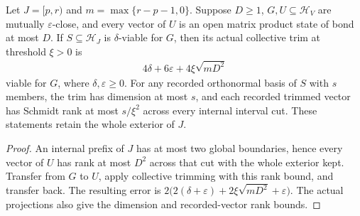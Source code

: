 \begin{lemma}
    \label{thm:interval_trimming_reference}
    \leanok
    Let $J=[p,r)$ and $m=\max\{r-p-1,0\}$. Suppose $D\ge1$,
    $G,U\subseteq\mathcal H_V$ are mutually $\varepsilon$-close, and
    every vector of $U$ is an open matrix product state of bond at most
    $D$. If $S\subseteq\mathcal H_J$ is $\delta$-viable for $G$, then
    its actual collective trim at threshold $\xi>0$ is
    \begin{align}
        4\delta+6\varepsilon+4\xi\sqrt{mD^2}
        \label{eq:interval_reference_trimming_error}
    \end{align}
    viable for $G$, where $\delta,\varepsilon\ge0$.
    For any recorded orthonormal basis of $S$ with $s$ members, the trim
    has dimension at most $s$, and each recorded trimmed vector has
    Schmidt rank at most $s/\xi^2$ across every internal interval cut.
    These statements retain the whole exterior of $J$.
\end{lemma}
\begin{proof}\leanok
    An internal prefix of $J$ has at most two global boundaries, hence
    every vector of $U$ has rank at most $D^2$ across that cut with the
    whole exterior kept. Transfer from $G$ to $U$, apply collective
    trimming with this rank bound, and transfer back. The resulting error
    is $2\bigl(2(\delta+\varepsilon)+2\xi\sqrt{mD^2}+\varepsilon\bigr)$.
    The actual projections also give the dimension and recorded-vector
    rank bounds.
\end{proof}

